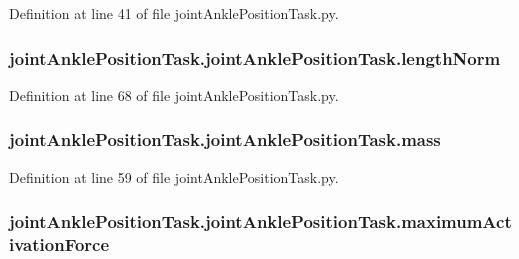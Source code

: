 Definition at line 41 of file joint\+Ankle\+Position\+Task.\+py.

\subsubsection[{\texorpdfstring{length\+Norm}{lengthNorm}}]{\setlength{\rightskip}{0pt plus 5cm}joint\+Ankle\+Position\+Task.\+joint\+Ankle\+Position\+Task.\+length\+Norm}\hypertarget{classjoint_ankle_position_task_1_1joint_ankle_position_task_a64d1c11c4513c7294f65d5184b3b9325}{}\label{classjoint_ankle_position_task_1_1joint_ankle_position_task_a64d1c11c4513c7294f65d5184b3b9325}


Definition at line 68 of file joint\+Ankle\+Position\+Task.\+py.

\subsubsection[{\texorpdfstring{mass}{mass}}]{\setlength{\rightskip}{0pt plus 5cm}joint\+Ankle\+Position\+Task.\+joint\+Ankle\+Position\+Task.\+mass}\hypertarget{classjoint_ankle_position_task_1_1joint_ankle_position_task_ae83e115a31e460e3d4292658331c4ff0}{}\label{classjoint_ankle_position_task_1_1joint_ankle_position_task_ae83e115a31e460e3d4292658331c4ff0}


Definition at line 59 of file joint\+Ankle\+Position\+Task.\+py.

\subsubsection[{\texorpdfstring{maximum\+Activation\+Force}{maximumActivationForce}}]{\setlength{\rightskip}{0pt plus 5cm}joint\+Ankle\+Position\+Task.\+joint\+Ankle\+Position\+Task.\+maximum\+Activation\+Force}\hypertarget{classjoint_ankle_position_task_1_1joint_ankle_position_task_a4f36a115acf205a4fe25d29f3e7a4196}{}\label{classjoint_ankle_position_task_1_1joint_ankle_position_task_a4f36a115acf205a4fe25d29f3e7a4196}


